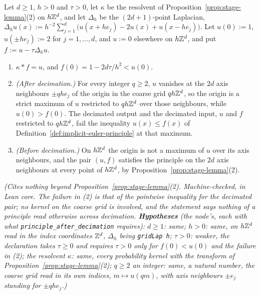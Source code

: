 \begin{proposition}
\label{prop:principle-after-decimation}
\leanok
{}
Let $d \ge 1$, $h > 0$ and $\tau > 0$, let $\kappa$ be the resolvent of
Proposition~\ref{prop:stage-lemma}(2) on $h\mathbb{Z}^d$, and let $\Delta_h$ be the $(2d+1)$-point
Laplacian, $\Delta_hu(x) := h^{-2}\sum_{j=1}^d\bigl(u(x + he_j) - 2u(x) + u(x - he_j)\bigr)$. Let
$u(0) := 1$, $u(\pm he_j) := 2$ for $j = 1, \dots, d$, and $u := 0$ elsewhere on $h\mathbb{Z}^d$, and put
$f := u - \tau\Delta_hu$.
\begin{enumerate}
\item $\kappa * f = u$, and $f(0) = 1 - 2d\tau/h^2 < u(0)$.
\item \emph{(After decimation.)} For every integer $q \ge 2$, $u$ vanishes at the $2d$ axis
neighbours $\pm qhe_j$ of the origin in the coarse grid $qh\mathbb{Z}^d$, so the origin is a strict
maximum of $u$ restricted to $qh\mathbb{Z}^d$ over those neighbours, while $u(0) > f(0)$. The decimated
output and the decimated input, $u$ and $f$ restricted to $qh\mathbb{Z}^d$, fail the inequality
$u(x) \le f(x)$ of Definition~\ref{def:implicit-euler-principle} at that maximum.
\item \emph{(Before decimation.)} On $h\mathbb{Z}^d$ the origin is not a maximum of $u$ over its axis
neighbours, and the pair $(u, f)$ satisfies the principle on the $2d$ axis neighbours at every
point of $h\mathbb{Z}^d$, by Proposition~\ref{prop:stage-lemma}(2).
\end{enumerate}
\statusT\quad\emph{(Cites nothing beyond Proposition~\ref{prop:stage-lemma}(2). Machine-checked, in
Lean core. The failure in (2) is that of the pointwise inequality for the decimated pair; no kernel
on the coarse grid is involved, and the statement says nothing of a principle read otherwise
across decimation. \textbf{Hypotheses} (the node's, each with what
\texttt{principle\_after\_decimation} requires): $d \ge 1$: same; $h > 0$: same, on $h\mathbb{Z}^d$ read in
the index coordinates $\mathbb{Z}^d$, $\Delta_h$ being \texttt{gridLap h}; $\tau > 0$: weaker, the
declaration takes $\tau \ge 0$ and requires $\tau > 0$ only for $f(0) < u(0)$ and the failure in
(2); the resolvent $\kappa$: same, every probability kernel with the transform of
Proposition~\ref{prop:stage-lemma}(2); $q \ge 2$ an integer: same, a natural number, the coarse grid
read in its own indices, $m \mapsto u(qm)$, with axis neighbours $\pm e_j$ standing for
$\pm qhe_j$.)}
\end{proposition}

